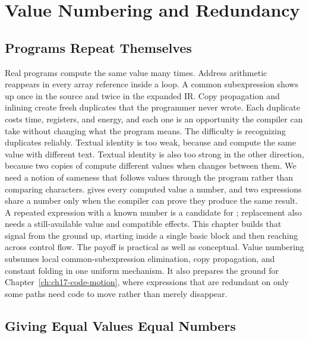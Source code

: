 \chapter{Value Numbering and Redundancy}
\label{ch:ch16-value-numbering-redundancy}

\section{Programs Repeat Themselves}
\label{sec:ch16-repeated-work}

Real programs compute the same value many times.
Address arithmetic reappears in every array reference inside a loop.
A common subexpression shows up once in the source and twice in the expanded IR.
Copy propagation and inlining create fresh duplicates that the programmer never wrote.
Each duplicate costs time, registers, and energy, and each one is an opportunity the compiler can take without changing what the program means.
The difficulty is recognizing duplicates reliably.
Textual identity is too weak, because  and  compute the same value with different text.
Textual identity is also too strong in the other direction, because two copies of  compute different values when  changes between them.
We need a notion of sameness that follows values through the program rather than comparing characters.
 gives every computed value a number, and two expressions share a number only when the compiler can prove they produce the same result.
A repeated expression with a known number is a candidate for ; replacement also needs a still-available value and compatible effects.
This chapter builds that signal from the ground up, starting inside a single basic block and then reaching across control flow.
The payoff is practical as well as conceptual.
Value numbering subsumes local common-subexpression elimination, copy propagation, and constant folding in one uniform mechanism.
It also prepares the ground for Chapter~\ref{ch:ch17-code-motion}, where expressions that are redundant on only some paths need code to move rather than merely disappear.

\section{Giving Equal Values Equal Numbers}
\label{sec:ch16-naming-values}

